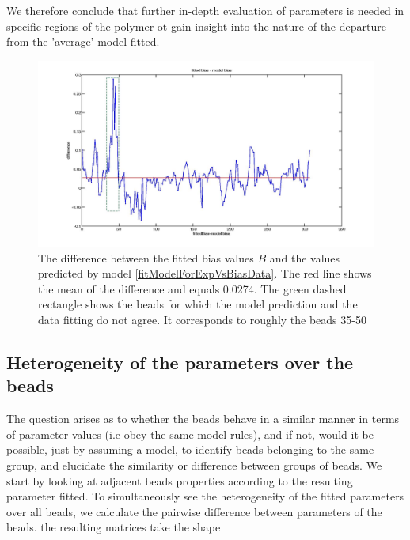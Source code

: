 \documentclass[12pt]{paper}
\begin{document}
We therefore conclude that further in-depth evaluation of parameters is needed in specific regions of the polymer ot gain insight into the nature of the departure from the 'average' model fitted.

\begin{figure}[H]\label{diffFittedBiasVsModelBias}
\includegraphics[scale=0.15]{diffFittedBiasVsModelBias}
\caption{\scriptsize{The difference between the fitted bias values $B$ and the values predicted by model \ref{fitModelForExpVsBiasData}. The red line shows the mean of the difference and equals 0.0274. The green dashed rectangle shows the beads for which the model prediction and the data fitting do not agree. It corresponds to roughly the beads 35-50}}
\end{figure}

\subsection{Heterogeneity of the parameters over the beads}
The question arises as to whether the beads behave in a similar manner in terms of parameter values (i.e obey the same model rules), and if not, would it be possible, just by assuming a model, to identify beads belonging to the same group, and elucidate the similarity or difference between groups of beads. 
We start by looking at adjacent beads properties according to the resulting parameter fitted.
To simultaneously see the heterogeneity of the fitted parameters over all beads, we calculate the pairwise difference between parameters of the beads. 
the resulting matrices take the shape
\end{document}
